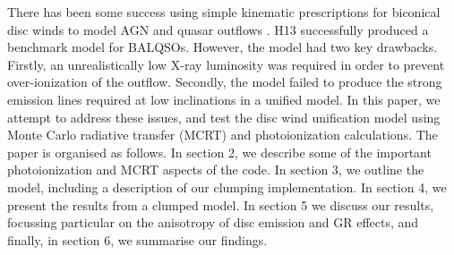 \documentclass[preprint, a4paper, 11pt]{aastex}
\begin{document}
There has been some success using simple
kinematic prescriptions for biconical disc winds to model 
AGN and quasar outflows \citep[][hereafter H13]{simlong2008,sim2010,higginbottom2013}. 
H13 successfully produced a benchmark model for BALQSOs. However, the model
had two key drawbacks. Firstly, an unrealistically low X-ray luminosity
was required in order to prevent over-ionization of the outflow.
Secondly, the model failed to produce the strong emission lines 
required at low inclinations in a unified model.
In this paper, we attempt to address these issues, and test the disc wind 
unification model using Monte Carlo radiative transfer (MCRT) and photoionization 
calculations. The paper is organised as follows.
In section 2, we describe some of the important photoionization 
and MCRT aspects of the code. In section 3, we outline the model, including 
a description of our clumping implementation. In section 4, we present the results 
from a clumped model. In section 5 we discuss our results, 
focussing particular on the anisotropy of 
disc emission and GR effects, and finally, in section 6, we summarise our findings.






\end{document}
